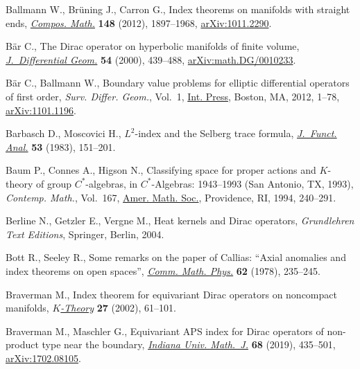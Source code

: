 \documentclass[pdftex]{sigma}%
\numberwithin{equation}{section}
\begin{document}
\begin{thebibliography}{99}
Ballmann W., Br\"uning J., Carron G., Index theorems on manifolds with straight
 ends, \href{https://doi.org/10.1112/S0010437X12000401}{\textit{Compos. Math.}} \textbf{148} (2012), 1897--1968,
 \href{https://arxiv.org/abs/1011.2290}{arXiv:1011.2290}.

B\"ar C., The {D}irac operator on hyperbolic manifolds of finite volume,
 \href{https://doi.org/10.4310/jdg/1214339790}{\textit{J.~Differential Geom.}} \textbf{54} (2000), 439--488,
 \href{https://arxiv.org/abs/math.DG/0010233}{arXiv:math.DG/0010233}.

B\"ar C., Ballmann W., Boundary value problems for elliptic differential
 operators of first order, \textit{{Surv. Differ. Geom.}}, Vol.~1, \href{https://doi.org/10.4310/SDG.2012.v17.n1.a1}{Int. Press}, Boston, MA, 2012, 1--78,
 \href{https://arxiv.org/abs/1101.1196}{arXiv:1101.1196}.

Barbasch D., Moscovici H., {$L^{2}$}-index and the {S}elberg trace formula,
 \href{https://doi.org/10.1016/0022-1236(83)90050-2}{\textit{J.~Funct. Anal.}} \textbf{53} (1983), 151--201.

Baum P., Connes A., Higson N., Classifying space for proper actions and
 {$K$}-theory of group {$C^\ast$}-algebras, in {$C^\ast$}-Algebras: 1943--1993
 ({S}an {A}ntonio, {TX}, 1993), \textit{Contemp. Math.}, Vol.~167, \href{https://doi.org/10.1090/conm/167/1292018}{Amer. Math.
 Soc.}, Providence, RI, 1994, 240--291.

Berline N., Getzler E., Vergne M., Heat kernels and {D}irac operators,
 \textit{Grundlehren Text Editions}, Springer, Berlin, 2004.

Bott R., Seeley R., Some remarks on the paper of {C}allias: ``{A}xial anomalies
 and index theorems on open spaces'', \href{https://doi.org/10.1007/BF01202526}{\textit{Comm. Math. Phys.}} \textbf{62}
 (1978), 235--245.

Braverman M., Index theorem for equivariant {D}irac operators on noncompact
 manifolds, \href{https://doi.org/10.1023/A:1020842205711}{\textit{$K$-Theory}} \textbf{27} (2002), 61--101.

Braverman M., Maschler G., Equivariant {APS} index for {D}irac operators of
 non-product type near the boundary, \href{https://doi.org/10.1512/iumj.2019.68.7621}{\textit{Indiana Univ. Math.~J.}}
 \textbf{68} (2019), 435--501, \href{https://arxiv.org/abs/1702.08105}{arXiv:1702.08105}.


\end{thebibliography}
\end{document}
